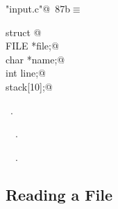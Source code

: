 \documentclass[a4paper]{report}
\begin{document}
\begin{flushleft} \small
\begin{minipage}{\linewidth}\label{scrap180}\raggedright\small
{} \verb@"input.c"@\nobreak\ {\footnotesize {87b}}$\equiv$
\vspace{-1ex}
\begin{list}{}{} \item
\mbox{}\verb@static struct {@\\
\mbox{}\verb@  FILE *file;@\\
\mbox{}\verb@  char *name;@\\
\mbox{}\verb@  int line;@\\
\mbox{}\verb@} stack[10];@\\
\mbox{}\verb@@{\NWsep}
\end{list}
\vspace{-1.5ex}
\footnotesize
\begin{list}{}{\setlength{\itemsep}{-\parsep}\setlength{\itemindent}{-\leftmargin}}
\item \NWtxtFileDefBy\ .
\item \NWtxtIdentsDefed\nobreak\  \verb@stack@\nobreak\ .\item \NWtxtIdentsUsed\nobreak\  \verb@FILE@\nobreak\ .
\item{}
\end{list}
\end{minipage}\vspace{4ex}
\end{flushleft}
\subsection{Reading a File}
\end{document}
